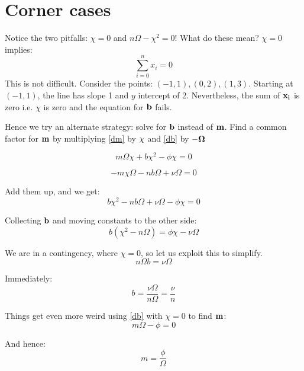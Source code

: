 \documentclass{article}
\begin{document}
\section{Corner cases}

Notice the two pitfalls:  $\chi = 0$ and $n \Omega - \chi^2 = 0$!   What
do these mean?   $\chi = 0$ implies:
\begin{equation}
\sum_{i=0}^n x_i = 0
\end{equation}
This is not difficult.  Consider the points: $(-1, 1), (0, 2), (1, 3)$.
Starting at $(-1, 1)$, the line has slope 1 and $y$ intercept of 2.
Nevertheless, the sum of ${\bf x_i}$ is zero i.e. ${\chi}$ is zero and the
equation for ${\bf b}$ fails.

Hence we try an alternate strategy: solve for ${\bf b}$ instead of ${\bf m}$.
Find a common factor for ${\bf m}$ by multiplying \eqref{dm} by ${\bf \chi}$
 and \eqref{db} by ${\bf -\Omega}$

\begin{equation}
 m \Omega \chi + b \chi^2 - \phi \chi = 0
\end{equation}

\begin{equation}
- m \chi \Omega - n b \Omega + \nu \Omega = 0
\end{equation}

Add them up, and we get:
\begin{equation}
 b \chi^2 - n b \Omega + \nu \Omega - \phi \chi  = 0
\end{equation}

Collecting ${\bf b}$ and moving constants to the other side:
\begin{equation}
b (\chi^2 - n \Omega) =  \phi \chi - \nu \Omega
\end{equation}

We are in a contingency, where $\chi = 0$, so let us exploit this to simplify.
\begin{equation}
n \Omega b =  \nu \Omega
\end{equation}

Immediately:
\begin{equation}
b = \frac{\nu \Omega}{n \Omega} = \frac{\nu}{n}
\end{equation}

Things get even more weird using \eqref{db} with $\chi = 0$ to find ${\bf m}$:
\begin{equation}
m \Omega - \phi = 0
\end{equation}

And hence:
\begin{equation}
m = \frac{\phi}{\Omega}
\end{equation}
\end{document}
